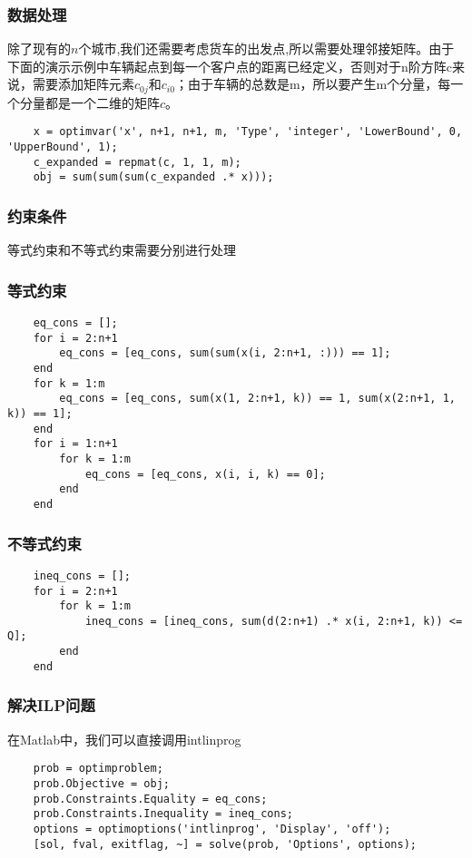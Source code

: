 \subsubsection{数据处理}
除了现有的$n$个城市,我们还需要考虑货车的出发点,所以需要处理邻接矩阵。由于下面的演示示例中车辆起点到每一个客户点的距离已经定义，否则对于n阶方阵c来说，需要添加矩阵元素$c_{0j}$和$c_{i0}$；由于车辆的总数是m，所以要产生m个分量，每一个分量都是一个二维的矩阵$c$。
    \begin{lstlisting}
    x = optimvar('x', n+1, n+1, m, 'Type', 'integer', 'LowerBound', 0, 'UpperBound', 1);
    c_expanded = repmat(c, 1, 1, m);
    obj = sum(sum(sum(c_expanded .* x)));
    \end{lstlisting}
\subsubsection{约束条件}
    等式约束和不等式约束需要分别进行处理
    \subsubsection{等式约束}
    \begin{lstlisting}
    eq_cons = [];
    for i = 2:n+1
        eq_cons = [eq_cons, sum(sum(x(i, 2:n+1, :))) == 1];
    end
    for k = 1:m
        eq_cons = [eq_cons, sum(x(1, 2:n+1, k)) == 1, sum(x(2:n+1, 1, k)) == 1];
    end
    for i = 1:n+1
        for k = 1:m
            eq_cons = [eq_cons, x(i, i, k) == 0];
        end
    end
    \end{lstlisting}
    \subsubsection{不等式约束}
    \begin{lstlisting}
    ineq_cons = [];
    for i = 2:n+1
        for k = 1:m
            ineq_cons = [ineq_cons, sum(d(2:n+1) .* x(i, 2:n+1, k)) <= Q];
        end
    end
    \end{lstlisting}
\subsubsection{解决ILP问题}
    在Matlab中，我们可以直接调用intlinprog
    \begin{lstlisting}
    prob = optimproblem;
    prob.Objective = obj;
    prob.Constraints.Equality = eq_cons;
    prob.Constraints.Inequality = ineq_cons;
    options = optimoptions('intlinprog', 'Display', 'off');
    [sol, fval, exitflag, ~] = solve(prob, 'Options', options);
    \end{lstlisting}
